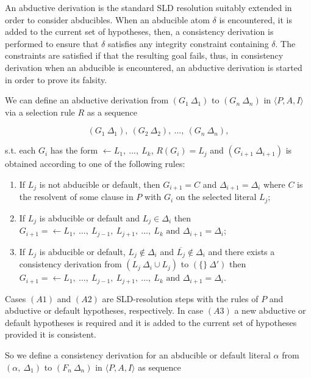 An abductive derivation is the standard SLD resolution suitably extended in order to consider abducibles. When an abducible atom $\delta$ is encountered, it is added to the current set of hypotheses, then, a consistency derivation is performed to ensure that $\delta$ satisfies any integrity constraint containing $\delta$.
The constraints are satisfied if that the resulting goal fails, thus, in consistency derivation when an abducible is encountered, an abductive derivation is started in order to prove its falsity.

We can define an abductive derivation from $(G_1\ \Delta_1)$ to $(G_n\ \Delta_n)$ in $\langle P, A, I\rangle$ via a selection rule $R$ as a sequence

\begin{equation}
    (G_1\ \Delta_1),\ (G_2\ \Delta_2),\ ..., \ (G_n\ \Delta_n),  
\end{equation}

s.t. each $G_i$ has the form $\leftarrow L_1, \ ..., \ L_k$, $R(G_i) = L_j$ and $(G_{i+1}\ \Delta_{i+1})$ is obtained according to one of the following rules:

\begin{enumerate}[label=(A\arabic*)]
    \item If $L_j$ is not abducible or default, then $G_{i+1} = C$ and $\Delta_{i+1} = \Delta_i$ where $C$ is the resolvent of some clause in $P$ with $G_i$ on the selected literal $L_j$;
    \item If $L_j$ is abducible or default and $L_j \in \Delta_i$ then \\
    $G_{i+1} = \leftarrow L_1,\ \dots,\ L_{j-1},\ L_{j+1},\ \dots,\ L_k \text{ and } \Delta_{i+1} = \Delta_i$;
    \item If $L_j$ is abducible or default, $L_j \notin \Delta_i$ and $\overline{L_j} \notin \Delta_i$ and there exists a consistency derivation from $(L_j\ \Delta_i \cup {L_j})$ to $(\{\}\ \Delta')$ then
    $G_{i+1} = \leftarrow L_1,\ \dots,\ L_{j-1},\ L_{j+1},\ \dots,\ L_k \text{ and } \Delta_{i+1} = \Delta_i$.
\end{enumerate}

Cases $(A1)$ and $(A2)$ are SLD-resolution steps with the rules of $P$ and abductive or default hypotheses, respectively. In case $(A3)$ a new abductive or default hypotheses is required and it is added to the current set of hypotheses provided it is consistent.

So we define a consistency derivation for an abducible or default literal $\alpha$ from $(\alpha,\ \Delta_1)$ to $(F_n\ \Delta_n)$ in $\langle P, A, I\rangle$ as sequence

